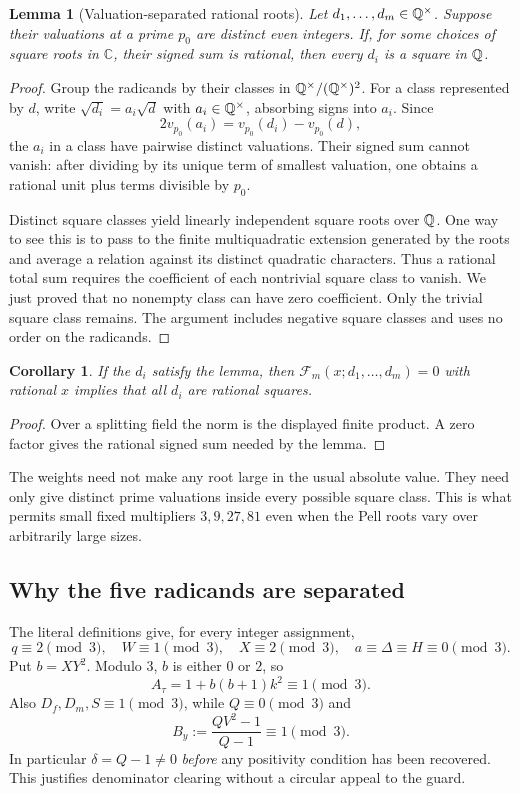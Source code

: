 \documentclass[11pt]{article}
\newtheorem{lemma}[theorem]{Lemma}
\newtheorem{corollary}[theorem]{Corollary}
\theoremstyle{remark}\newtheorem{remark}[theorem]{Remark}
\begin{document}
\begin{lemma}[Valuation-separated rational roots]\label{lem:separation}
Let $d_1,\ldots,d_m\in\mathbb Q^\times$. Suppose their valuations at a prime
$p_0$ are distinct even integers. If, for some choices of square roots in
$\mathbb C$, their signed sum is rational, then every $d_i$ is a square
in $\mathbb Q$.
\end{lemma}
\begin{proof}
Group the radicands by their classes in $\mathbb Q^\times/(\mathbb Q^\times)^2$.
For a class represented by $d$, write $\sqrt{d_i}=a_i\sqrt d$ with
$a_i\in\mathbb Q^\times$, absorbing signs into $a_i$. Since
\[
 2v_{p_0}(a_i)=v_{p_0}(d_i)-v_{p_0}(d),
\]
the $a_i$ in a class have pairwise distinct valuations. Their signed sum
cannot vanish: after dividing by its unique term of smallest valuation,
one obtains a rational unit plus terms divisible by $p_0$.

Distinct square classes yield linearly independent square roots over
$\mathbb Q$. One way to see this is to pass to the finite multiquadratic extension
generated by the roots and average a relation against its distinct
quadratic characters. Thus a rational total sum requires the coefficient
of each nontrivial square class to vanish. We just proved that no nonempty
class can have zero coefficient. Only the trivial square class remains.
The argument includes negative square classes and uses no order on the
radicands.
\end{proof}

\begin{corollary}\label{cor:norm}
If the $d_i$ satisfy the lemma, then
$\mathcal F_m(x;d_1,\ldots,d_m)=0$ with rational $x$ implies that all
$d_i$ are rational squares.
\end{corollary}
\begin{proof}
Over a splitting field the norm is the displayed finite product. A zero
factor gives the rational signed sum needed by the lemma.
\end{proof}

The weights need not make any root large in the usual absolute value.
They need only give distinct prime valuations inside every possible square
class. This is what permits small fixed multipliers $3,9,27,81$ even when
the Pell roots vary over arbitrarily large sizes.

\subsection{Why the five radicands are separated}
The literal definitions give, for every integer assignment,
\[
 q\equiv2\pmod3,\quad W\equiv1\pmod3,\quad
 X\equiv2\pmod3,\quad a\equiv\Delta\equiv H\equiv0\pmod3.
\]
Put $b=XY^2$. Modulo $3$, $b$ is either $0$ or $2$, so
\[
 A_\tau=1+b(b+1)k^2\equiv1\pmod3.
\]
Also $D_f,D_m,S\equiv1\pmod3$, while $Q\equiv0\pmod3$ and
\[
 B_y:=\frac{QV^2-1}{Q-1}\equiv1\pmod3.
\]
In particular $\delta=Q-1\ne0$ \emph{before} any positivity condition
has been recovered. This justifies denominator clearing without a
circular appeal to the guard.
\end{document}
